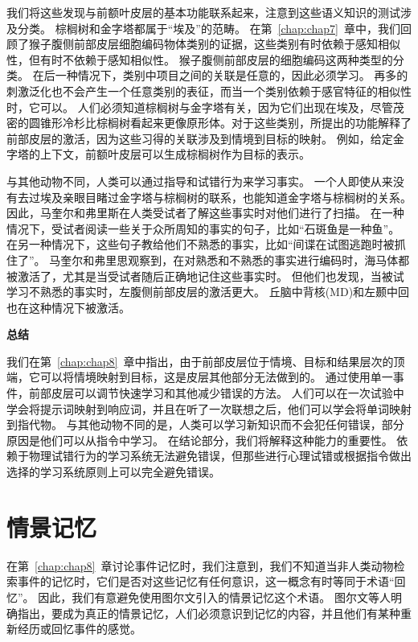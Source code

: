 我们将这些发现与前额叶皮层的基本功能联系起来，注意到这些语义知识的测试涉及分类。
棕榈树和金字塔都属于“埃及”的范畴。
在第~\ref{chap:chap7}~章中，我们回顾了猴子腹侧前部皮层细胞编码物体类别的证据，这些类别有时依赖于感知相似性，但有时不依赖于感知相似性。
猴子腹侧前部皮层的细胞编码这两种类型的分类。
在后一种情况下，类别中项目之间的关联是任意的，因此必须学习。
再多的刺激泛化也不会产生一个任意类别的表征，而当一个类别依赖于感官特征的相似性时，它可以。
人们必须知道棕榈树与金字塔有关，因为它们出现在埃及，尽管茂密的圆锥形冷杉比棕榈树看起来更像原形体。对于这些类别，所提出的功能解释了前部皮层的激活，因为这些习得的关联涉及到情境到目标的映射。
例如，给定金字塔的上下文，前额叶皮层可以生成棕榈树作为目标的表示。
\par


与其他动物不同，人类可以通过指导和试错行为来学习事实。
一个人即使从来没有去过埃及亲眼目睹过金字塔与棕榈树的联系，也能知道金字塔与棕榈树的关系。
因此，马奎尔和弗里斯\cite{maguire2004brain}在人类受试者了解这些事实时对他们进行了扫描。
在一种情况下，受试者阅读一些关于众所周知的事实的句子，比如“石斑鱼是一种鱼”。
在另一种情况下，这些句子教给他们不熟悉的事实，比如“间谍在试图逃跑时被抓住了”。
马奎尔和弗里思观察到，在对熟悉和不熟悉的事实进行编码时，海马体都被激活了，尤其是当受试者随后正确地记住这些事实时。
但他们也发现，当被试学习不熟悉的事实时，左腹侧前部皮层的激活更大。
丘脑中背核(MD)和左颞中回也在这种情况下被激活。
\par



\textbf{总结}
\par
我们在第~\ref{chap:chap8}~章中指出，由于前部皮层位于情境、目标和结果层次的顶端，它可以将情境映射到目标，这是皮层其他部分无法做到的。
通过使用单一事件，前部皮层可以调节快速学习和其他减少错误的方法。
人们可以在一次试验中学会将提示词映射到响应词，并且在听了一次联想之后，他们可以学会将单词映射到指代物\cite{bloom2002children}。
与其他动物不同的是，人类可以学习新知识而不会犯任何错误，部分原因是他们可以从指令中学习。
在结论部分，我们将解释这种能力的重要性。
依赖于物理试错行为的学习系统无法避免错误，但那些进行心理试错或根据指令做出选择的学习系统原则上可以完全避免错误。



\section{情景记忆}

在第~\ref{chap:chap8}~章讨论事件记忆时，我们注意到，我们不知道当非人类动物检索事件的记忆时，它们是否对这些记忆有任何意识，这一概念有时等同于术语“回忆”。
因此，我们有意避免使用图尔文\cite{tulving1983elements}引入的情景记忆这个术语。
图尔文等人明确指出，要成为真正的情景记忆，人们必须意识到记忆的内容，并且他们有某种重新经历或回忆事件的感觉。
\par


